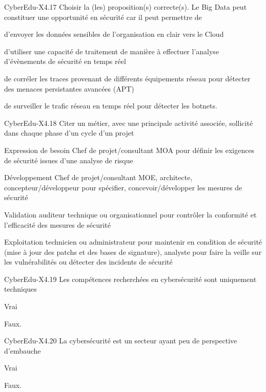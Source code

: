 \begin{multi}[multiple=true]{CyberEdu-X4.17}
Choisir la (les) proposition(s) correcte(s). Le Big Data peut constituer une opportunité en sécurité car il peut permettre de 
\item	d'envoyer les données sensibles de l'organisation en clair vers le Cloud 
\item*	d'utiliser une capacité de traitement de manière à effectuer l'analyse d'évènements de sécurité en temps réel 
\item*	de corréler les traces provenant de différents équipements réseau pour détecter des menaces persistantes avancées (APT) 
\item*	de surveiller le trafic réseau en temps réel pour détecter les botnets.
\end{multi}
\begin{multi}[multiple=true]{CyberEdu-X4.18}
Citer un métier, avec une principale activité associée, sollicité dans chaque phase d'un cycle d'un projet 
\item*	Expression de besoin  Chef de projet/consultant MOA pour définir les exigences de sécurité issues d'une analyse de risque
\item*	Développement  Chef de projet/consultant MOE, architecte, concepteur/développeur  pour spécifier, concevoir/développer les mesures de sécurité
\item*	Validation  auditeur technique ou organisationnel pour contrôler la conformité et l'efficacité des mesures de sécurité
\item*	Exploitation  technicien ou administrateur pour maintenir en condition de sécurité (mise à jour des patchs et des bases de signature), analyste pour faire la veille sur les vulnérabilités ou détecter des incidents de sécurité
\end{multi}

\begin{multi}[multiple=true]{CyberEdu-X4.19}	
Les compétences recherchées en cybersécurité sont uniquement techniques 
\item Vrai 
\item* Faux.
\end{multi}

\begin{multi}[multiple=true]{CyberEdu-X4.20}
La cybersécurité est un secteur ayant peu de perspective d'embauche 
\item	Vrai 
\item*	Faux.
\end{multi}

